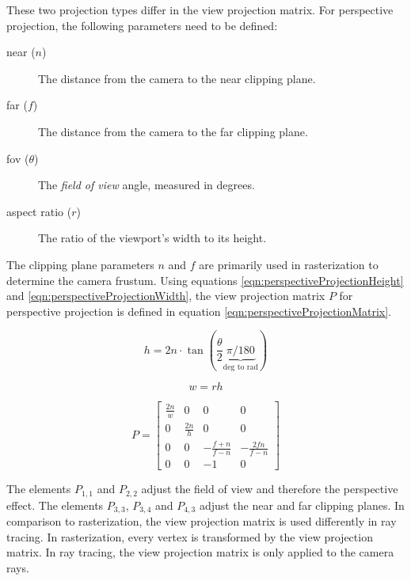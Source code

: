 These two projection types differ in the view projection matrix. For perspective projection, the following parameters need to be defined:

\begin{description}
    \item[near ($n$)] The distance from the camera to the near clipping plane.
    \item[far ($f$)] The distance from the camera to the far clipping plane.
    \item[fov ($\theta$)] The \textit{field of view} angle, measured in degrees.
    \item[aspect ratio ($r$)] The ratio of the viewport's width to its height.
\end{description}

The clipping plane parameters $n$ and $f$ are primarily used in rasterization to determine the camera frustum. Using equations \ref{eqn:perspectiveProjectionHeight} and \ref{eqn:perspectiveProjectionWidth}, the view projection matrix $P$ for perspective projection is defined in equation \ref{eqn:perspectiveProjectionMatrix}.

\begin{equation}
    \label{eqn:perspectiveProjectionHeight}
    h = 2n \cdot \tan(\frac{\theta}{2} \underbrace{\pi / 180}_{\text{deg to rad}})
\end{equation}

\begin{equation}
    \label{eqn:perspectiveProjectionWidth}
    w = rh
\end{equation}

\begin{equation}
    \label{eqn:perspectiveProjectionMatrix}
    P = 
    \begin{bmatrix}
        \frac{2n}{w} & 0 & 0 & 0 \\
        0 & \frac{2n}{h} & 0 & 0 \\
        0 & 0 & -\frac{f + n}{f - n} & -\frac{2fn}{f - n} \\
        0 & 0 & -1 & 0
    \end{bmatrix}
\end{equation}

The elements $P_{1,1}$ and $P_{2,2}$ adjust the field of view and therefore the perspective effect. The elements $P_{3,3}$, $P_{3,4}$ and $P_{4,3}$ adjust the near and far clipping planes. In comparison to rasterization, the view projection matrix is used differently in ray tracing. In rasterization, every vertex is transformed by the view projection matrix. In ray tracing, the view projection matrix is only applied to the camera rays.

